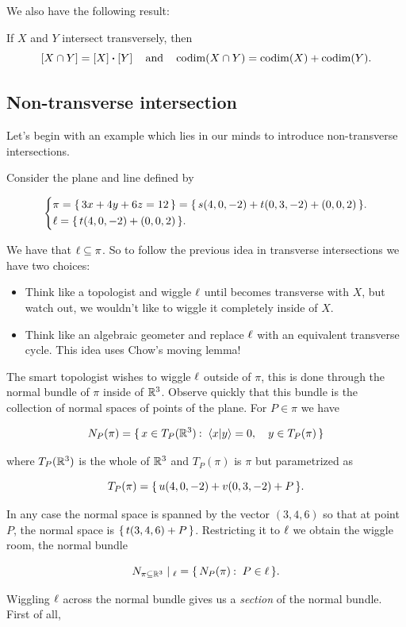 \documentclass[12pt]{memoir}
\begin{document}
We also have the following result:

\begin{Prop}
    If \(X\) and \(Y\) intersect transversely, then
    \[    \bonj{X \cap Y} = \bonj{X} \. \bonj{Y} \quad \text{and} \quad \codim(X \cap Y) = \codim(X) + \codim(Y).
    \]
\end{Prop}

\subsection{Non-transverse intersection}

Let's begin with an example which lies in our minds to introduce non-transverse intersections.

\begin{Ex}
    Consider the plane and line defined by

    \[    \left\lbrace
        \begin{aligned}
             & \pi=\{\,3x+4y+6z=12\,\}=\{\,s(4,0,-2)+t(0,3,-2)+(0,0,2)\,\}. \\
             & \ell=\{\,t(4,0,-2)+(0,0,2)\,\}.
        \end{aligned}
        \right.
    \]

    We have that \(\ell\subseteq\pi\). So to follow the previous idea in transverse intersections we have two choices:
    \begin{itemize}
        \item Think like a topologist and wiggle \(\ell\) until becomes transverse with \(X\), but watch out, we wouldn't like to wiggle it completely inside of \(X\).
        \item Think like an algebraic geometer and replace \(\ell\) with an equivalent transverse cycle. This idea uses Chow's moving lemma!
    \end{itemize}
    The smart topologist wishes to wiggle \(\ell\) outside of \(\pi\), this is done through the normal bundle of \(\pi\) inside of \(\mathbb{R}^3\). Observe quickly that this bundle is the collection of normal spaces of points of the plane. For \(P\in\pi\) we have

    \[N_P(\pi)=\set{x\in T_P(\bR^3)\:\ \braket{x}{y}=0,\quad y\in T_P(\pi)}\]

    where \(T_P(\mathbb{R}^3)\) is the whole of \(\mathbb{R}^3\) and \(T_P(\pi)\) is \(\pi\) but parametrized as

    \[T_P(\pi)=\{\,u(4,0,-2)+v(0,3,-2)+P\,\}.\]

    In any case the normal space is spanned by the vector \((3,4,6)\) so that at point \(P\), the normal space is \(\{\,t(3,4,6)+P\,\}\). Restricting it to \(\ell\) we obtain the wiggle room, the normal bundle

    \[N_{\pi\subseteq\bR^3}\mid_{\l}=\set{N_P(\pi)\:\ P\in\l}.\]

    Wiggling \(\ell\) across the normal bundle gives us a \emph{section} of the normal bundle. First of all, 
\end{Ex}
\end{document}
